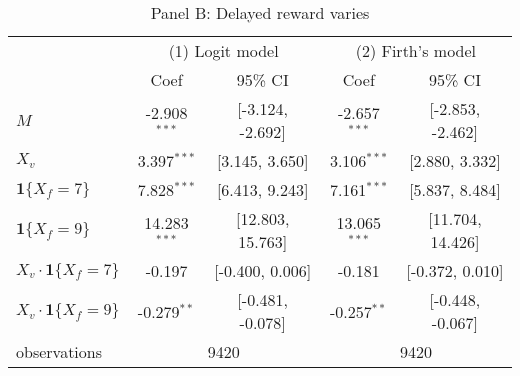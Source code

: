 \documentclass[12pt]{article}
\begin{document}
\begin{table}
    \begin{subtable}{\textwidth}
        \centering
        \captionsetup{justification=centering}
        \caption*{Panel B: Delayed reward varies}
\begin{tabular}{lcccc}
  \hline
   & \multicolumn{2}{c}{(1) Logit model} & \multicolumn{2}{c}{(2) Firth's model} \\ & Coef & 95\% CI & Coef & 95\% CI \\ \hline
$M$ & -2.908$^{***}$ & [-3.124, -2.692] & -2.657$^{***}$ & [-2.853, -2.462] \\ 
  $X_v$ & 3.397$^{***}$ & [3.145, 3.650] & 3.106$^{***}$ & [2.880, 3.332] \\ 
  $\textbf{1}\{X_f = 7\}$ & 7.828$^{***}$ & [6.413, 9.243] & 7.161$^{***}$ & [5.837, 8.484] \\ 
  $\textbf{1}\{X_f = 9\}$ & 14.283$^{***}$ & [12.803, 15.763] & 13.065$^{***}$ & [11.704, 14.426] \\ 
  $X_v\cdot\textbf{1}\{X_f = 7\}$ & -0.197 & [-0.400, 0.006] & -0.181 & [-0.372, 0.010] \\ 
  $X_v\cdot\textbf{1}\{X_f = 9\}$ & -0.279$^{**}$ & [-0.481, -0.078] & -0.257$^{**}$ & [-0.448, -0.067] \\ 
   \hline observations & \multicolumn{2}{c}{9420} & \multicolumn{2}{c}{9420} \\ \hline
\end{tabular}

    \end{subtable}        
\end{table}
\end{document}
